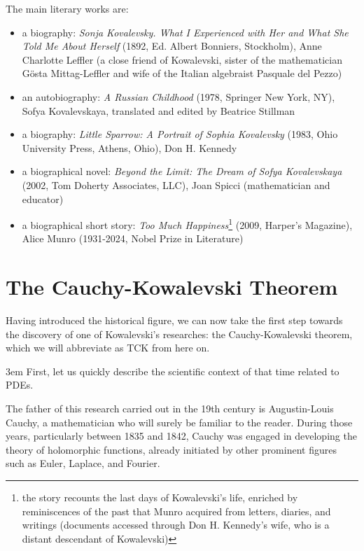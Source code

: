 The main literary works are:
\begin{itemize}

\item a biography: \textit{Sonja Kovalevsky. What I Experienced with Her and What She Told Me About Herself} (1892, Ed. Albert Bonniers, Stockholm), Anne Charlotte Leffler (a close friend of Kowalevski, sister of the mathematician Gösta Mittag-Leffler and wife of the Italian algebraist Pasquale del Pezzo)

\item an autobiography: \textit{A Russian Childhood} (1978, Springer New York, NY), Sofya Kovalevskaya, translated and edited by Beatrice Stillman

\item a biography: \textit{Little Sparrow: A Portrait of Sophia Kovalevsky} (1983, Ohio University Press, Athens, Ohio), Don H. Kennedy

\item a biographical novel: \textit{Beyond the Limit: The Dream of Sofya Kovalevskaya} (2002, Tom Doherty Associates, LLC), Joan Spicci (mathematician and educator)

\item a biographical short story: \textit{Too Much Happiness}\footnote{the story recounts the last days of Kowalevski's life, enriched by reminiscences of the past that Munro acquired from letters, diaries, and writings (documents accessed through Don H. Kennedy's wife, who is a distant descendant of Kowalevski)}
(2009, Harper's Magazine), Alice Munro (1931-2024, Nobel Prize in Literature)

\end{itemize}

\section{The Cauchy-Kowalevski Theorem}

Having introduced the historical figure, we can now take the first step towards the discovery of one of Kowalevski's researches: the Cauchy-Kowalevski theorem, which we will abbreviate as TCK from here on.

\emergencystretch 3em
First, let us quickly describe the scientific context of that time related to PDEs.

The father of this research carried out in the 19th century is Augustin-Louis Cauchy, a mathematician who will surely be familiar to the reader. During those years, particularly between 1835 and 1842, Cauchy was engaged in developing the theory of holomorphic functions, already initiated by other prominent figures such as Euler, Laplace, and Fourier.


